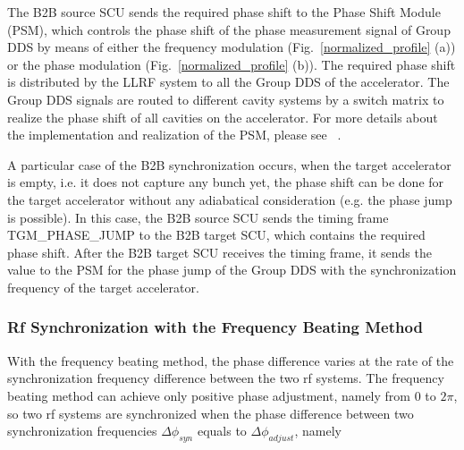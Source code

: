 The B2B source SCU sends the required phase shift to the Phase Shift Module (\gls{PSM}), which controls the phase shift of the phase measurement signal of Group DDS by means of either the frequency modulation (Fig.~\ref{normalized_profile} (a)) or the phase modulation (Fig.~\ref{normalized_profile} (b)). The required phase shift is distributed by the LLRF system to all the Group DDS of the accelerator. The Group DDS signals are routed to different cavity systems by a switch matrix to realize the phase shift of all cavities on the accelerator. For more details about the implementation and realization of the PSM, please see ~\cite{ferrand_development_nodate}.

A particular case of the B2B synchronization occurs, when the target accelerator is empty, i.e. it does not capture any bunch yet, the phase shift can be done for the target accelerator without any adiabatical consideration (e.g. the phase jump is possible). In this case, the B2B source SCU sends the timing frame TGM\_PHASE\_JUMP to the B2B target SCU, which contains the required phase shift. After the B2B target SCU receives the timing frame, it sends the value to the PSM for the phase jump of the Group DDS with the synchronization frequency of the target accelerator.

\subsubsection{Rf Synchronization with the Frequency Beating Method}

With the frequency beating method, the phase difference varies at the rate of the synchronization frequency difference between the two rf systems. The frequency beating method can achieve only positive phase adjustment, namely from 0 to $2\pi$, so two rf systems are synchronized when the phase difference between two synchronization frequencies $\Delta \phi_\mathit{syn}$ equals to $\Delta \phi_\mathit{adjust}$, namely
%
%
%
%

